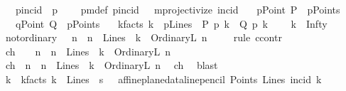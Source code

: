 \begin{isabellebody}
\ \ \ pincid\ {\isacharparenleft}{\kern0pt}\ {\isachardoublequoteopen}p{\isasymlhd}{\isachardoublequoteclose}\ {}{}{\isacharparenright}{\kern0pt}\isanewline
\ \ \ pm{\isacharunderscore}{\kern0pt}def{\isacharcolon}{\kern0pt}\ {\isacartoucheopen}pincid\ {\isacharequal}{\kern0pt}\ \ mprojectivize\ {\isacharparenleft}{\kern0pt}incid{\isacharparenright}{\kern0pt}{\isacartoucheclose}\isanewline
\ \ \ pPoint{\isacharcolon}{\kern0pt}\ {\isachardoublequoteopen}P\ {\isasymin}\ pPoints{\isachardoublequoteclose}\isanewline
\ \ \ qPoint{\isacharcolon}{\kern0pt}\ {\isachardoublequoteopen}Q\ {\isasymin}\ pPoints{\isachardoublequoteclose}\isanewline
\ \ \ k{\isacharunderscore}{\kern0pt}facts{\isacharcolon}{\kern0pt}\ {\isachardoublequoteopen}k\ {\isasymin}\ pLines\ {\isasymand}\ P\ p{\isasymlhd}\ k\ {\isasymand}\ Q\ p{\isasymlhd}\ k{\isachardoublequoteclose}\ \isanewline
\ \ \ {\isachardoublequoteopen}k\ {\isacharequal}{\kern0pt}\ Infty{\isachardoublequoteclose}\isanewline
%
\isadelimproof
%
\endisadelimproof
%
\isatagproof
{}\isamarkupfalse%
\ {\isacharminus}{\kern0pt}\isanewline
\ \ \isamarkupfalse%
\ not{\isacharunderscore}{\kern0pt}ordinary{\isacharcolon}{\kern0pt}\ {\isachardoublequoteopen}{\isasymnot}\ {\isacharparenleft}{\kern0pt}{\isasymexists}\ n\ {\isachardot}{\kern0pt}\ n\ {\isasymin}\ Lines\ {\isasymand}\ k\ {\isacharequal}{\kern0pt}\ OrdinaryL\ n{\isacharparenright}{\kern0pt}{\isachardoublequoteclose}\ \isanewline
\ \ \isamarkupfalse%
\ {\isacharparenleft}{\kern0pt}rule\ ccontr{\isacharparenright}{\kern0pt}\isanewline
\ \ \ \ \isamarkupfalse%
\ ch{\isacharcolon}{\kern0pt}\ {\isachardoublequoteopen}{\isasymnot}\ {\isasymnot}\ {\isacharparenleft}{\kern0pt}{\isasymexists}\ n\ {\isachardot}{\kern0pt}\ n\ {\isasymin}\ Lines\ {\isasymand}\ k\ {\isacharequal}{\kern0pt}\ OrdinaryL\ n{\isacharparenright}{\kern0pt}{\isachardoublequoteclose}\isanewline
\ \ \ \ \isamarkupfalse%
\ ch{}{\isacharcolon}{\kern0pt}\ {\isachardoublequoteopen}{\isasymexists}\ n\ {\isachardot}{\kern0pt}\ n\ {\isasymin}\ Lines\ {\isasymand}\ k\ {\isacharequal}{\kern0pt}\ OrdinaryL\ n{\isachardoublequoteclose}\ \isamarkupfalse%
\ ch\ \isamarkupfalse%
\ blast\isanewline
\ \ \ \ \isamarkupfalse%
\ k{}\ \ k{}{\isacharunderscore}{\kern0pt}facts{\isacharcolon}{\kern0pt}\ {\isachardoublequoteopen}k{}\ {\isasymin}\ Lines\ {\isasymand}\ s\ {\isacharequal}{\kern0pt}\ \ affine{\isacharunderscore}{\kern0pt}plane{\isacharunderscore}{\kern0pt}data{\isachardot}{\kern0pt}line{\isacharunderscore}{\kern0pt}pencil\ Points\ Lines\ {\isacharparenleft}{\kern0pt}incid{\isacharparenright}{\kern0pt}\ k{}{\isachardoublequoteclose}\ \isanewline

\end{isabellebody}
